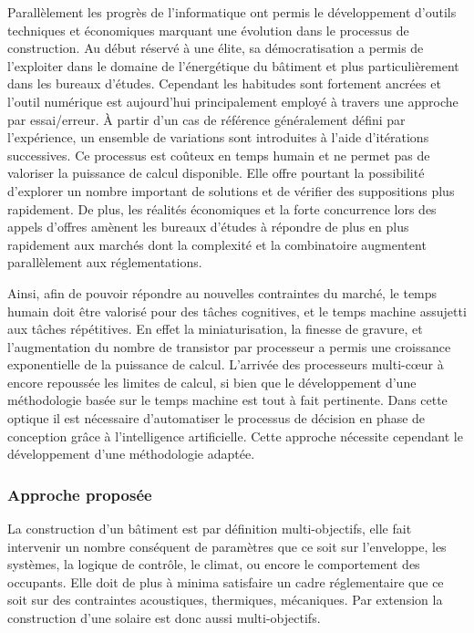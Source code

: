 Parallèlement les progrès de l’informatique ont permis le développement d’outils
techniques et économiques marquant une évolution dans le processus de construction. Au
début réservé à une élite, sa démocratisation a permis de l’exploiter dans le domaine de
l’énergétique du bâtiment et plus particulièrement dans les bureaux d’études. Cependant
les habitudes sont fortement ancrées et l’outil numérique est aujourd’hui principalement
employé à travers une approche par essai/erreur. À partir d’un cas de référence
généralement défini par l’expérience, un ensemble de variations sont introduites à l’aide
d’itérations successives. Ce processus est coûteux en temps humain et ne permet pas de
valoriser la puissance de calcul disponible. Elle offre pourtant la possibilité d’explorer
un nombre important de solutions et de vérifier des suppositions plus rapidement. De plus,
les réalités économiques et la forte concurrence lors des appels d’offres amènent les
bureaux d’études à répondre de plus en plus rapidement aux marchés dont la complexité et
la combinatoire augmentent parallèlement aux réglementations.

Ainsi, afin de pouvoir répondre au nouvelles contraintes du marché, le temps humain doit
être valorisé pour des tâches cognitives, et le temps machine assujetti aux tâches
répétitives. En effet la miniaturisation, la finesse de gravure, et l’augmentation du
nombre de transistor par processeur a permis une croissance exponentielle de la puissance
de calcul. L’arrivée des processeurs multi-cœur à encore repoussée les limites de calcul,
si bien que le développement d’une méthodologie basée sur le temps machine est tout à fait
pertinente. Dans cette optique il est nécessaire d’automatiser le processus de décision en
phase de conception grâce à l’intelligence artificielle. Cette approche nécessite cependant
le développement d’une méthodologie adaptée.


\subsubsection{Approche proposée} %
\label{ssub:approche_proposee}
La construction d’un bâtiment est par définition multi-objectifs, elle fait intervenir un
nombre conséquent de paramètres que ce soit sur l’enveloppe, les systèmes, la logique de
contrôle, le climat, ou encore le comportement des occupants. Elle doit de plus à minima
satisfaire un cadre réglementaire que ce soit sur des contraintes acoustiques, thermiques,
mécaniques. Par extension la construction d’une  solaire est donc aussi multi-objectifs.

